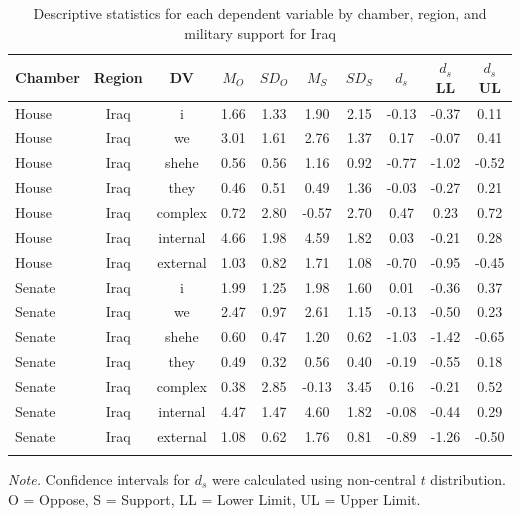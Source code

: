 \documentclass[english,,man,floatsintext]{apa6}
\begin{document}
\begin{table}[tbp]
\begin{center}
\begin{threeparttable}
\caption{\label{tab:Itable}Descriptive statistics for each dependent variable by chamber, 
          region, and military support for Iraq}
\small{
\begin{tabular}{lccccccccc}
\toprule
Chamber & Region & DV & $M_O$ & $SD_O$ & $M_S$ & $SD_S$ & $d_s$ & $d_s$ LL & $d_s$ UL\\
\midrule
House & Iraq & i & 1.66 & 1.33 & 1.90 & 2.15 & -0.13 & -0.37 & 0.11\\
House & Iraq & we & 3.01 & 1.61 & 2.76 & 1.37 & 0.17 & -0.07 & 0.41\\
House & Iraq & shehe & 0.56 & 0.56 & 1.16 & 0.92 & -0.77 & -1.02 & -0.52\\
House & Iraq & they & 0.46 & 0.51 & 0.49 & 1.36 & -0.03 & -0.27 & 0.21\\
House & Iraq & complex & 0.72 & 2.80 & -0.57 & 2.70 & 0.47 & 0.23 & 0.72\\
House & Iraq & internal & 4.66 & 1.98 & 4.59 & 1.82 & 0.03 & -0.21 & 0.28\\
House & Iraq & external & 1.03 & 0.82 & 1.71 & 1.08 & -0.70 & -0.95 & -0.45\\
Senate & Iraq & i & 1.99 & 1.25 & 1.98 & 1.60 & 0.01 & -0.36 & 0.37\\
Senate & Iraq & we & 2.47 & 0.97 & 2.61 & 1.15 & -0.13 & -0.50 & 0.23\\
Senate & Iraq & shehe & 0.60 & 0.47 & 1.20 & 0.62 & -1.03 & -1.42 & -0.65\\
Senate & Iraq & they & 0.49 & 0.32 & 0.56 & 0.40 & -0.19 & -0.55 & 0.18\\
Senate & Iraq & complex & 0.38 & 2.85 & -0.13 & 3.45 & 0.16 & -0.21 & 0.52\\
Senate & Iraq & internal & 4.47 & 1.47 & 4.60 & 1.82 & -0.08 & -0.44 & 0.29\\
Senate & Iraq & external & 1.08 & 0.62 & 1.76 & 0.81 & -0.89 & -1.26 & -0.50\\
\bottomrule
\addlinespace
\end{tabular}
}
\begin{tablenotes}[para]
\normalsize{\textit{Note.} Confidence intervals for $d_s$ were calculated using 
          non-central $t$ distribution. O = Oppose, S = Support, LL = Lower Limit, UL = Upper Limit.}
\end{tablenotes}
\end{threeparttable}
\end{center}
\end{table}
\end{document}
